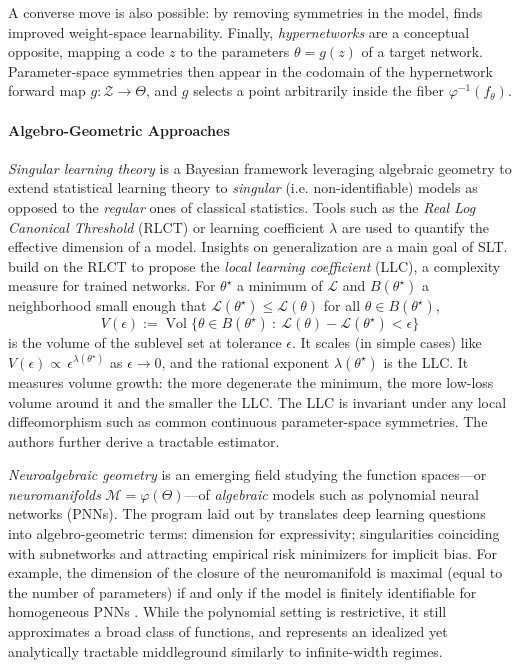 \documentclass[mathematics,review,submit,moreauthors]{Definitions/mdpi}
\begin{document}
A converse move is also possible: by removing symmetries in the model, \citet{lim2024} finds improved weight-space learnability.
Finally, \emph{hypernetworks} \citep{ha2017} are a conceptual opposite, mapping a code $z$ to the parameters $\theta=g(z)$ of a target network.
Parameter-space symmetries then appear in the codomain of the hypernetwork forward map $g:\mathcal Z\to \Theta$, and $g$ selects a point arbitrarily inside the fiber $\varphi^{-1}(f_\theta)$.

\paragraph{Algebro-Geometric Approaches}
\emph{Singular learning theory} \citep[SLT,][]{watanabe2009} is a Bayesian framework leveraging algebraic geometry to extend statistical learning theory to \emph{singular} (i.e. non-identifiable) models as opposed to the \emph{regular} ones of classical statistics.
Tools such as the \emph{Real Log Canonical Threshold} (RLCT) or learning coefficient $\lambda$ are used to quantify the effective dimension of a model.
Insights on generalization are a main goal of SLT.
\citet{lau2025p2icais} build on the RLCT to propose the \emph{local learning coefficient} (LLC), a complexity measure for trained networks.
For $\theta^\star$ a minimum of $\mathcal{L}$ and $B(\theta^\star)$ a neighborhood small enough that $\mathcal{L}(\theta^\star)\le\mathcal{L}(\theta)$ for all $\theta\in B(\theta^\star)$,
\begin{equation*}
    V(\epsilon):=\operatorname{Vol}\big\{\theta\in B(\theta^\star)\ :\ \mathcal{L}(\theta)-\mathcal{L}(\theta^\star)<\epsilon\big\}
\end{equation*}
is the volume of the sublevel set at tolerance $\epsilon$.
It scales (in simple cases) like $V(\epsilon)\propto\,\epsilon^{\lambda(\theta^\star)}$ as $\epsilon\to0$, and the rational exponent $\lambda(\theta^\star)$ is the LLC.
It measures volume growth: the more degenerate the minimum, the more low-loss volume around it and the smaller the LLC.
The LLC is invariant under any local diffeomorphism such as common continuous parameter-space symmetries.
The authors further derive a tractable estimator.

\emph{Neuroalgebraic geometry} \citep{marchetti2025a} is an emerging field studying the function spaces---or \emph{neuromanifolds} $\mathcal{M}=\varphi(\Theta)$---of \emph{algebraic} models such as polynomial neural networks (PNNs).
The program laid out by \citet{marchetti2025a} translates deep learning questions into algebro-geometric terms: dimension for expressivity; singularities coinciding with subnetworks and attracting empirical risk minimizers for implicit bias.
For example, the dimension of the closure of the neuromanifold is maximal (equal to the number of parameters) if and only if the model is finitely identifiable for homogeneous PNNs \citep{usevich2025}.
While the polynomial setting is restrictive, it still approximates a broad class of functions, and represents an idealized yet analytically tractable middleground similarly to infinite-width regimes.
\end{document}
